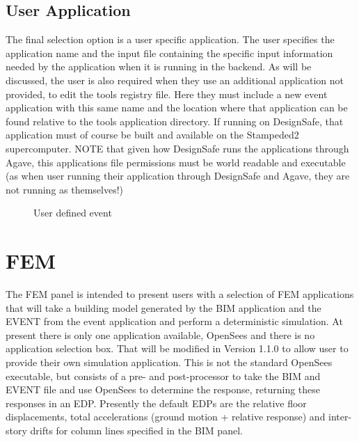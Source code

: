\subsection{User Application}
The final selection option is a user specific application. 
The user specifies the application name and the input file containing the specific input information 
needed by the application when it is running in the backend. 
As will be discussed, the user is also required when they use an additional application not provided, 
to edit the tools registry file. Here they must include a new event application with this same name 
and the location where that application can be found relative to the tools application directory. 
If running on DesignSafe, that application must of course be built and available on the Stampeded2 supercomputer. 
NOTE that given how DesignSafe runs the applications through Agave, this applications file permissions must be 
world readable and executable (as when user running their application through DesignSafe and Agave, they are not running as themselves!)

\begin{figure}[!htbp]
  \caption{User defined event}
  \label{fig:figure8}
\end{figure}


\section{FEM}
The FEM panel is intended to present users with a selection of FEM applications that will take a building model 
generated by the BIM application and the EVENT from the event application and perform a deterministic simulation. 
At present there is only one application available, OpenSees and there is no application selection box. 
That will be modified in Version 1.1.0 to allow user to provide their own simulation application. 
This is not the standard OpenSees executable, but consists of a pre- and post-processor to take the 
BIM and EVENT file and use OpenSees to determine the response, returning these responses in an EDP. 
Presently the default EDPs are the relative floor displacements, total accelerations (ground motion + relative response) 
and inter-story drifts for column lines specified in the BIM panel.

